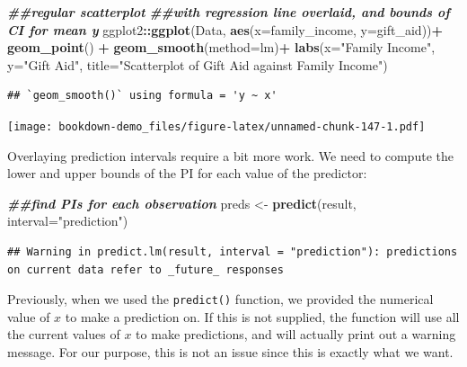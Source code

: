 \documentclass[
]{book}
\newenvironment{Shaded}{\begin{snugshade}}{\end{snugshade}}
\newcommand{\AttributeTok}[1]{\textcolor[rgb]{0.13,0.29,0.53}{#1}}
\newcommand{\DocumentationTok}[1]{\textcolor[rgb]{0.56,0.35,0.01}{\textbf{\textit{#1}}}}
\newcommand{\FunctionTok}[1]{\textcolor[rgb]{0.13,0.29,0.53}{\textbf{#1}}}
\newcommand{\NormalTok}[1]{#1}
\newcommand{\OtherTok}[1]{\textcolor[rgb]{0.56,0.35,0.01}{#1}}
\newcommand{\SpecialCharTok}[1]{\textcolor[rgb]{0.81,0.36,0.00}{\textbf{#1}}}
\newcommand{\StringTok}[1]{\textcolor[rgb]{0.31,0.60,0.02}{#1}}
\begin{document}
\begin{Shaded}
\begin{Highlighting}[]
\DocumentationTok{\#\#regular scatterplot}
\DocumentationTok{\#\#with regression line overlaid, and bounds of CI for mean y}
\NormalTok{ggplot2}\SpecialCharTok{::}\FunctionTok{ggplot}\NormalTok{(Data, }\FunctionTok{aes}\NormalTok{(}\AttributeTok{x=}\NormalTok{family\_income, }\AttributeTok{y=}\NormalTok{gift\_aid))}\SpecialCharTok{+}
  \FunctionTok{geom\_point}\NormalTok{() }\SpecialCharTok{+}
  \FunctionTok{geom\_smooth}\NormalTok{(}\AttributeTok{method=}\NormalTok{lm)}\SpecialCharTok{+}
  \FunctionTok{labs}\NormalTok{(}\AttributeTok{x=}\StringTok{"Family Income"}\NormalTok{, }
       \AttributeTok{y=}\StringTok{"Gift Aid"}\NormalTok{, }
       \AttributeTok{title=}\StringTok{"Scatterplot of Gift Aid against Family Income"}\NormalTok{)}
\end{Highlighting}
\end{Shaded}

\begin{verbatim}
## `geom_smooth()` using formula = 'y ~ x'
\end{verbatim}

\texttt{[image: bookdown-demo\_files/figure-latex/unnamed-chunk-147-1.pdf]}

Overlaying prediction intervals require a bit more work. We need to compute the lower and upper bounds of the PI for each value of the predictor:

\begin{Shaded}
\begin{Highlighting}[]
\DocumentationTok{\#\#find PIs for each observation}
\NormalTok{preds }\OtherTok{\textless{}{-}} \FunctionTok{predict}\NormalTok{(result, }\AttributeTok{interval=}\StringTok{"prediction"}\NormalTok{)}
\end{Highlighting}
\end{Shaded}

\begin{verbatim}
## Warning in predict.lm(result, interval = "prediction"): predictions on current data refer to _future_ responses
\end{verbatim}

Previously, when we used the \texttt{predict()} function, we provided the numerical value of \(x\) to make a prediction on. If this is not supplied, the function will use all the current values of \(x\) to make predictions, and will actually print out a warning message. For our purpose, this is not an issue since this is exactly what we want.
\end{document}
